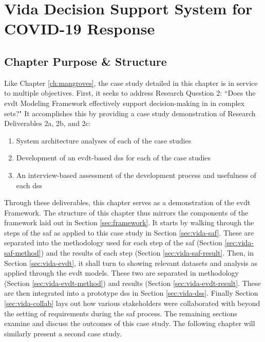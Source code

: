 \chapter{Vida Decision Support System for COVID-19 Response} \label{ch:vida}


\section{Chapter Purpose \& Structure}

Like Chapter \ref{ch:mangroves}, the case study detailed in this chapter is in service to multiple objectives. First, it seeks to address Research Question 2: ``Does the \ac{evdt} Modeling Framework effectively support decision-making in in complex \acf{sets}?" It accomplishes this by providing a case study demonstration of Research Deliverables 2a, 2b, and 2c: 

	\begin{enumerate}[label=\emph{\alph*},itemsep=0pt,parsep=0pt]
		\item{System architecture analyses of each of the case studies} 
		\item{Development of an \ac{evdt}-based \acf{dss} for each of the case studies} 
		\item{An interview-based assessment of the development process and usefulness of each \ac{dss}} 
	\end{enumerate}
	
Through these deliverables, this chapter serves as a demonstration of the \ac{evdt} Framework. The structure of this chapter thus mirrors the components of the framework laid out in Section \ref{sec:framework}. It starts by walking through the steps of the \acf{saf} as applied to this case study in Section \ref{sec:vida-saf}. These are separated into the methodology used for each step of the \ac{saf} (Section \ref{sec:vida-saf-method}) and the results of each step (Section \ref{sec:vida-saf-result}. Then, in Section \ref{sec:vida-evdt}, it shall turn to showing relevant datasets and analysis as applied through the \acf{evdt} models. These two are separated in methodology (Section \ref{sec:vida-evdt-method}) and results (Section \ref{sec:vida-evdt-result}. These are then integrated into a prototype \ac{dss} in Section \ref{sec:vida-dss}. Finally Section \ref{sec:vida-collab} lays out how various stakeholders were collaborated with beyond the setting of requirements during the \ac{saf} process. The remaining sections examine and discuss the outcomes of this case study. The following chapter will similarly present a second case study.  

